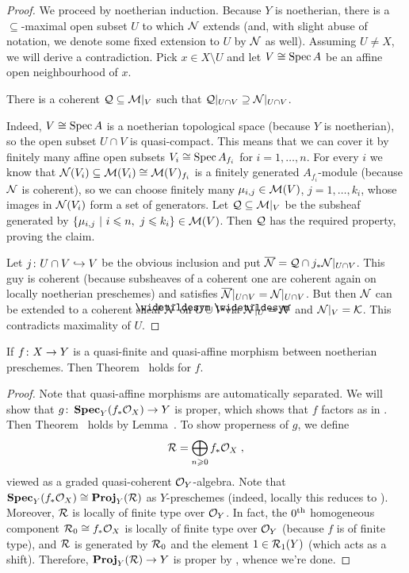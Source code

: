 \documentclass[a4paper,parskip=half,numbers=enddot, DIV=12]{scrreprt}
\renewcommand{\geq}{\geqslant}
\renewcommand{\leq}{\leqslant}
\begin{document}
\begin{proof}
	We proceed by noetherian induction. Because $Y$ is noetherian, there is a $\subseteq$-maximal open subset $U$ to which $\mathcal{N}$ extends (and, with slight abuse of notation, we denote some fixed extension to $U$ by $\mathcal{N}$ as well). Assuming $U\neq X$, we will derive a contradiction. Pick $x\in X\setminus U$ and let $V\cong \operatorname{Spec} A$ be an affine open neighbourhood of $x$. 
	\begin{claim*}
		There is a coherent $\mathcal{Q}\subseteq \mathcal{M}|_V$ such that $\mathcal{Q}|_{U\cap V}\supseteq \mathcal{N}|_{U\cap V}$.
	\end{claim*}
	Indeed, $V\cong \operatorname{Spec} A$ is a noetherian topological space (because $Y$ is noetherian), so the open subset $U\cap V$ is quasi-compact. This means that we can cover it by finitely many affine open subsets $V_i\cong \operatorname{Spec} A_{f_i}$ for $i=1,\ldots,n$. For every $i$ we know that $\mathcal{N}(V_i)\subseteq \mathcal{M}(V_i)\cong \mathcal{M}(V)_{f_i}$ is a finitely generated $A_{f_i}$-module (because $\mathcal{N}$ is coherent), so we can choose finitely many $\mu_{i,j}\in \mathcal{M}(V)$, $j=1,\ldots,k_i$, whose images in $\mathcal{N}(V_i)$ form a set of generators. Let $\mathcal{Q}\subseteq \mathcal{M}|_V$ be the subsheaf generated by $\left\{\mu_{i,j}\st i\leq n,\ j\leq k_i\right\}\in\Mm(V)$. Then $\mathcal{Q}$ has the required property, proving the claim.
	
	Let $j\colon U\cap V\monomorphism V$ be the obvious inclusion and put $\overline{\mathcal{N}}=\mathcal{Q}\cap j_*\mathcal{N}|_{U\cap V}$. This guy is coherent (because subsheaves of a coherent one are coherent again on locally noetherian preschemes) and satisfies $\overline{\mathcal{N}}|_{U\cap V}=\mathcal{N}|_{U\cap V}$. But then $\mathcal{N}$ can be extended to a coherent sheaf $\snake{\Nn}$ on $U\cup V$ via $\snake{\Nn}|_U=\Nn$ and $\mathcal{N}|_V=\mathcal{K}$. This contradicts maximality of $U$.
\end{proof}
\begin{lem}
	If $f\colon X\morphism Y$ is a quasi-finite and quasi-affine morphism between noetherian preschemes. Then Theorem~ holds for $f$.
\end{lem}
\begin{proof}
	Note that quasi-affine morphisms are automatically separated. We will show that $g\colon \SPEC_Y(f_*\Oo_X)\morphism Y$ is proper, which shows that $f$ factors as in . Then Theorem~ holds by Lemma~. To show properness of $g$, we define
	\begin{align*}
		\Rr=\bigoplus_{n\geq 0}f_*\Oo_X\;,
	\end{align*}
	viewed as a graded quasi-coherent $\mathcal{O}_Y$-algebra. Note that $\operatorname{\mathbf{Spec}}_Y(f_*\mathcal{O}_X)\cong \operatorname{\mathbf{Proj}}_Y(\mathcal{R})$ as $Y$-preschemes (indeed, locally this reduces to \cite[Example~2.6.2]{alggeo1}). Moreover, $\mathcal{R}$ is locally of finite type over $\mathcal{O}_Y$. In fact, the $0^{\text{th}}$ homogeneous component $\mathcal{R}_0\cong f_*\mathcal{O}_X$ is locally of finite type over $\mathcal{O}_Y$ (because $f$ is of finite type), and $\mathcal{R}$ is generated by $\mathcal{R}_0$ and the element $1\in\mathcal{R}_1(Y)$ (which acts as a shift). Therefore, $\PROJ_Y(\Rr)\morphism Y$ is proper by \cite[Proposition~2.4.2]{alggeo2}, whence we're done.
\end{proof}
\end{document}
